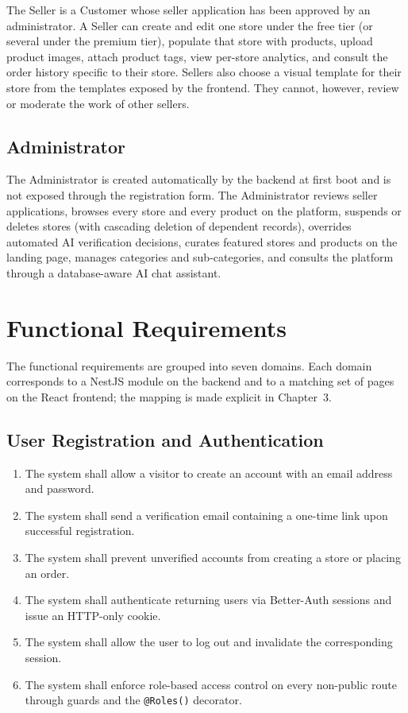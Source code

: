 \documentclass[12pt, a4paper, oneside]{report}
\begin{document}
The Seller is a Customer whose seller application has been approved
by an administrator. A Seller can create and edit one store under
the free tier (or several under the premium tier), populate that
store with products, upload product images, attach product tags,
view per-store analytics, and consult the order history specific to
their store. Sellers also choose a visual template for their store
from the templates exposed by the frontend. They cannot, however,
review or moderate the work of other sellers.

\subsection{Administrator}

The Administrator is created automatically by the backend at first
boot and is not exposed through the registration form. The
Administrator reviews seller applications, browses every store and
every product on the platform, suspends or deletes stores (with
cascading deletion of dependent records), overrides automated AI
verification decisions, curates featured stores and products on the
landing page, manages categories and sub-categories, and consults
the platform through a database-aware AI chat assistant.

\section{Functional Requirements}
\label{sec:functional-requirements}

The functional requirements are grouped into seven domains. Each
domain corresponds to a NestJS module on the backend and to a
matching set of pages on the React frontend; the mapping is made
explicit in Chapter~3.

\subsection{User Registration and Authentication}

\begin{enumerate}[label=\textbf{FR-A\arabic*.},leftmargin=*,itemsep=2pt]
  \item The system shall allow a visitor to create an account with
        an email address and password.
  \item The system shall send a verification email containing a
        one-time link upon successful registration.
  \item The system shall prevent unverified accounts from creating a
        store or placing an order.
  \item The system shall authenticate returning users via Better-Auth
        sessions and issue an HTTP-only cookie.
  \item The system shall allow the user to log out and invalidate
        the corresponding session.
  \item The system shall enforce role-based access control on every
        non-public route through guards and the \texttt{@Roles()}
        decorator.
\end{enumerate}
\end{document}
